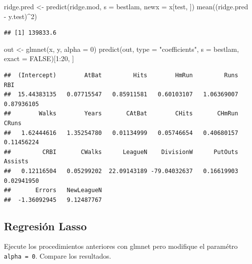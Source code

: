 \documentclass[
  12pt,
]{book}
\newenvironment{Shaded}{\begin{snugshade}}{\end{snugshade}}
\newcommand{\AttributeTok}[1]{\textcolor[rgb]{0.77,0.63,0.00}{#1}}
\newcommand{\ConstantTok}[1]{\textcolor[rgb]{0.00,0.00,0.00}{#1}}
\newcommand{\DecValTok}[1]{\textcolor[rgb]{0.00,0.00,0.81}{#1}}
\newcommand{\FunctionTok}[1]{\textcolor[rgb]{0.00,0.00,0.00}{#1}}
\newcommand{\NormalTok}[1]{#1}
\newcommand{\OtherTok}[1]{\textcolor[rgb]{0.56,0.35,0.01}{#1}}
\newcommand{\SpecialCharTok}[1]{\textcolor[rgb]{0.00,0.00,0.00}{#1}}
\newcommand{\StringTok}[1]{\textcolor[rgb]{0.31,0.60,0.02}{#1}}
\theoremstyle{definition}
\theoremstyle{definition}
\theoremstyle{definition}
\theoremstyle{remark}
\begin{document}
\begin{Shaded}
\begin{Highlighting}[]
\NormalTok{ridge.pred }\OtherTok{\textless{}{-}} \FunctionTok{predict}\NormalTok{(ridge.mod, }\AttributeTok{s =}\NormalTok{ bestlam, }\AttributeTok{newx =}\NormalTok{ x[test, }
\NormalTok{    ])}
\FunctionTok{mean}\NormalTok{((ridge.pred }\SpecialCharTok{{-}}\NormalTok{ y.test)}\SpecialCharTok{\^{}}\DecValTok{2}\NormalTok{)}
\end{Highlighting}
\end{Shaded}

\begin{verbatim}
## [1] 139833.6
\end{verbatim}

\begin{Shaded}
\begin{Highlighting}[]
\NormalTok{out }\OtherTok{\textless{}{-}} \FunctionTok{glmnet}\NormalTok{(x, y, }\AttributeTok{alpha =} \DecValTok{0}\NormalTok{)}
\FunctionTok{predict}\NormalTok{(out, }\AttributeTok{type =} \StringTok{"coefficients"}\NormalTok{, }\AttributeTok{s =}\NormalTok{ bestlam, }\AttributeTok{exact =} \ConstantTok{FALSE}\NormalTok{)[}\DecValTok{1}\SpecialCharTok{:}\DecValTok{20}\NormalTok{, }
\NormalTok{    ]}
\end{Highlighting}
\end{Shaded}

\begin{verbatim}
##  (Intercept)        AtBat         Hits        HmRun         Runs          RBI 
##  15.44383135   0.07715547   0.85911581   0.60103107   1.06369007   0.87936105 
##        Walks        Years       CAtBat        CHits       CHmRun        CRuns 
##   1.62444616   1.35254780   0.01134999   0.05746654   0.40680157   0.11456224 
##         CRBI       CWalks      LeagueN    DivisionW      PutOuts      Assists 
##   0.12116504   0.05299202  22.09143189 -79.04032637   0.16619903   0.02941950 
##       Errors   NewLeagueN 
##  -1.36092945   9.12487767
\end{verbatim}

\hypertarget{regresiuxf3n-lasso-1}{%
\subsection{Regresión Lasso}\label{regresiuxf3n-lasso-1}}

Ejecute los procedimientos anteriores con glmnet pero modifique el paramétro \texttt{alpha\ =\ 0}. Compare los resultados.
\end{document}
